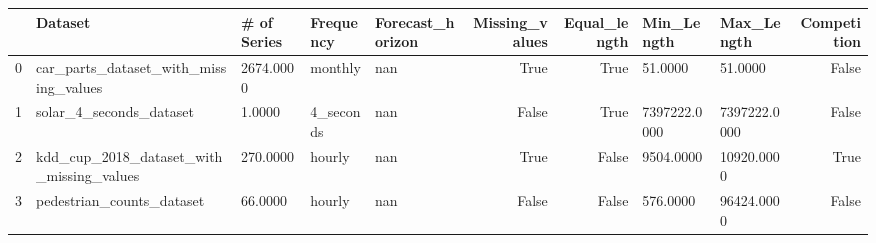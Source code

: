 \begin{tabular}{lllllrrllr}
    \toprule
    & Dataset & # of Series & Frequency & Forecast_horizon & Missing_values & Equal_length & Min_Length & Max_Length & Competition \\
    \midrule
    0 & car_parts_dataset_with_missing_values & 2674.0000 & monthly & nan & True & True & 51.0000 & 51.0000 & False \\
    1 & solar_4_seconds_dataset & 1.0000 & 4_seconds & nan & False & True & 7397222.0000 & 7397222.0000 & False \\
    2 & kdd_cup_2018_dataset_with_missing_values & 270.0000 & hourly & nan & True & False & 9504.0000 & 10920.0000 & True \\
    3 & pedestrian_counts_dataset & 66.0000 & hourly & nan & False & False & 576.0000 & 96424.0000 & False \\
    \bottomrule
\end{tabular}
